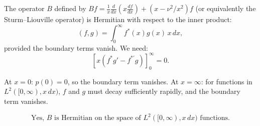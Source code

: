 \documentclass[12pt]{article}
\begin{document}
The operator $B$ defined by $Bf = \frac{1}{x}\frac{d}{dx}(x\frac{df}{dx}) + (x - \nu^2/x^2)f$ (or equivalently the Sturm--Liouville operator) is Hermitian with respect to the inner product:
\[
(f, g) = \int_0^{\infty}f^*(x)g(x)\,x\,dx,
\]
provided the boundary terms vanish. We need:
\[
\left[x\left(f^*g' - f^{*\prime}g\right)\right]_0^{\infty} = 0.
\]

At $x = 0$: $p(0) = 0$, so the boundary term vanishes. At $x = \infty$: for functions in $L^2([0,\infty), x\,dx)$, $f$ and $g$ must decay sufficiently rapidly, and the boundary term vanishes.

\[
\boxed{\text{Yes, } B \text{ is Hermitian on the space of } L^2([0,\infty), x\,dx) \text{ functions.}}
\]
\end{document}
